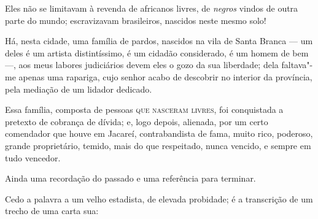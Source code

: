 Eles não se limitavam à revenda de africanos livres, de \emph{negros}
vindos de outra parte do mundo; escravizavam brasileiros, nascidos neste
mesmo solo!

Há, nesta cidade, uma família de pardos, nascidos na vila de Santa
Branca --- um deles é um artista distintíssimo, é um cidadão
considerado, é um homem de bem ---, aos meus labores judiciários devem
eles o gozo da sua liberdade; dela faltava"-me apenas uma rapariga, cujo
senhor acabo de descobrir no interior da província, pela mediação de um
lidador dedicado.

Essa família, composta de pessoas \textsc{que nasceram livres}, foi conquistada a
pretexto de cobrança de dívida; e, logo depois, alienada, por um certo
comendador que houve em Jacareí, contrabandista de fama, muito rico,
poderoso, grande proprietário, temido, mais do que respeitado, nunca
vencido, e sempre em tudo vencedor.

Ainda uma recordação do passado e uma referência para terminar.

Cedo a palavra a um velho estadista, de elevada probidade; é a
transcrição de um trecho de uma carta sua:

